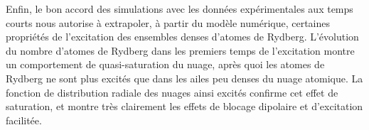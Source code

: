 Enfin, le bon accord des simulations avec les données expérimentales aux temps courts nous autorise à extrapoler, à partir du modèle numérique, certaines propriétés de l'excitation des ensembles denses d'atomes de Rydberg.
L'évolution du nombre d'atomes de Rydberg dans les premiers temps de l'excitation montre un comportement de quasi-saturation du nuage, après quoi les atomes de Rydberg ne sont plus excités que dans les ailes peu denses du nuage atomique.
La fonction de distribution radiale des nuages ainsi excités confirme cet effet de saturation, et montre très clairement les effets de blocage dipolaire et d'excitation facilitée.